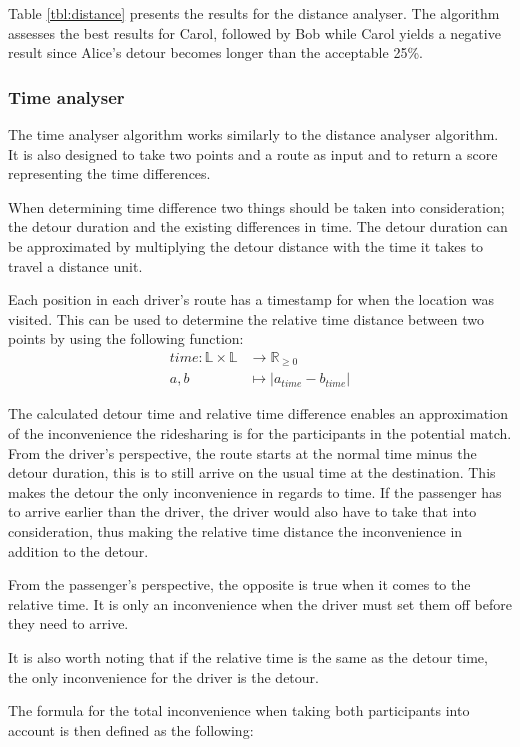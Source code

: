 Table \ref{tbl:distance} presents the results for the distance analyser.
The algorithm assesses the best results for Carol, followed by Bob while Carol yields a negative result since Alice's detour becomes longer than the acceptable 25\%. 


\subsubsection{Time analyser}
The time analyser algorithm works similarly to the distance analyser algorithm. 
It is also designed to take two points and a route as input and to return a score representing the time differences.

When determining time difference two things should be taken into consideration; the detour duration and the existing differences in time.
The detour duration can be approximated by multiplying the detour distance with the time it takes to travel a distance unit.

Each position in each driver's route has a timestamp for when the location was visited.
This can be used to determine the relative time distance between two points by using the following function:
\begin{align*}
	time : \mathbb{L}\times\mathbb{L} &\rightarrow \mathbb{R}_{\geq 0}\\
	a, b &\mapsto | a_{time} - b_{time} |
\end{align*}

The calculated detour time and relative time difference enables an approximation of the inconvenience the ridesharing is for the participants in the potential match.
From the driver's perspective, the route starts at the normal time minus the detour duration, this is to still arrive on the usual time at the destination.
This makes the detour the only inconvenience in regards to time.
If the passenger has to arrive earlier than the driver, the driver would also have to take that into consideration, thus making the relative time distance the inconvenience in addition to the detour.

From the passenger's perspective, the opposite is true when it comes to the relative time. 
It is only an inconvenience when the driver must set them off before they need to arrive.

It is also worth noting that if the relative time is the same as the detour time, the only inconvenience for the driver is the detour.

The formula for the total inconvenience when taking both participants into account is then defined as the following:

